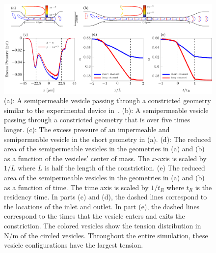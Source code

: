 \documentclass[9pt,twocolumn,twoside,lineno]{pnas-new}
\newif\ifTikz
\begin{document}
\begin{figure}[htp]
  \ifTikz
  
  \else
  \includegraphics{figures/stenosisComposite.pdf}
  \fi
  \caption{\label{fig:stenosisComposite} (a): A semipermeable vesicle
  passing through a constricted geometry similar to the experimental
  device in~\cite{abk-fai-sto2006}. (b): A semipermeable vesicle passing
  through a constricted geometry that is over five times longer. (c):
  The excess pressure of an impermeable and semipermeable vesicle in the
  short geometry in (a). (d): The reduced area of the semipermeable
  vesicles in the geometries in (a) and (b) as a function of the
  vesicles' center of mass. The $x$-axis is scaled by $1/L$ where $L$ is
  half the length of the constriction. (e) The reduced area of the
  semipermeable vesicles in the geometries in (a) and (b) as a function
  of time. The time axis is scaled by $1/t_R$ where $t_R$ is the
  residency time. In parts (c) and (d), the dashed lines correspond to
  the locations of the inlet and outlet. In part (e), the dashed lines
  correspond to the times that the vesicle enters and exits the
  constriction. The colored vesicles show the tension distribution in
  N/m of the circled vesicles. Throughout the entire simulation, these
  vesicle configurations have the largest tension.}
\end{figure}


\end{document}
